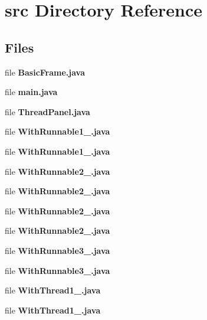 \section{src Directory Reference}
\label{dir_68267d1309a1af8e8297ef4c3efbcdba}
\subsection*{Files}
\begin{DoxyCompactItemize}
\item 
file {\bf Basic\+Frame.\+java}
\item 
file {\bf main.\+java}
\item 
file {\bf Thread\+Panel.\+java}
\item 
file {\bf With\+Runnable1\+\_.\+java}
\item 
file {\bf With\+Runnable1\+\_.\+java}
\item 
file {\bf With\+Runnable2\+\_.\+java}
\item 
file {\bf With\+Runnable2\+\_.\+java}
\item 
file {\bf With\+Runnable2\+\_.\+java}
\item 
file {\bf With\+Runnable2\+\_.\+java}
\item 
file {\bf With\+Runnable3\+\_.\+java}
\item 
file {\bf With\+Runnable3\+\_.\+java}
\item 
file {\bf With\+Thread1\+\_.\+java}
\item 
file {\bf With\+Thread1\+\_.\+java}
\end{DoxyCompactItemize}
